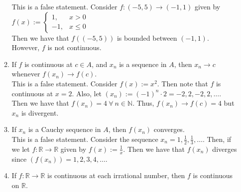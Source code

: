 \documentclass[12pt,letterpaper]{article}
\newcommand{\R}{\mathbb{R}}
\newcommand{\N}{\mathbb{N}}
\theoremstyle{case}
\theoremstyle{definition}
\begin{document}
\begin{enumerate}
\begin{enumerate}
				This is a false statement. Consider $f:(-5,5) \to (-1,1)$ given by $f(x):=\begin{cases}
				1, & x > 0 \\
				-1, & x \leq 0
				\end{cases}$\\
				Then we have that $f((-5,5))$ is bounded between $(-1,1)$. However, $f$ is not continuous. \\
				\item If $f$ is continuous at $c \in A$, and $x_n$ is a sequence in $A$, then $x_n \to c$ whenever $f(x_n) \to f(c)$.\\
				
				This is a false statement. Consider $f(x):=x^2$. Then note that $f$ is continuous at $x=2$. Also, let $(x_n):=(-1)^n \cdot 2=-2,2,-2,2, \dots$. Then we have that $f(x_n)=4\ \forall\ n \in \N$. Thus, $f(x_n) \to f(c)=4$ but $x_n$ is divergent.\\
				\item If $x_n$ is a Cauchy sequence in $A$, then $f(x_n)$ converges.\\
				
				This is a false statement. Consider the sequence $x_n=1, \frac{1}{2}, \frac{1}{3}, \dots$. Then, if we let $f: \R \to \R$ given by $f(x):=\frac{1}{x}$. Then we have that $f(x_n)$ diverges since $(f(x_n)) = 1, 2, 3, 4, \dots$.\\
				
				\item If $f:\R \to \R$ is continuous at each irrational number, then $f$ is continuous on $\R$.\\
				

\end{enumerate}
\end{enumerate}
\end{document}
